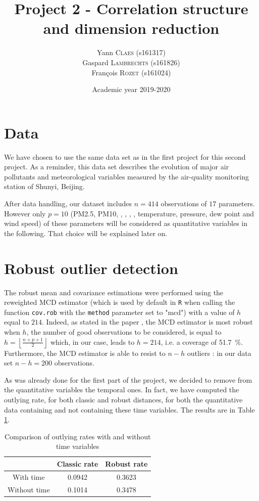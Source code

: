 \documentclass[a4paper, 12pt]{article}
\title{Project 2 - Correlation structure and dimension reduction}
\author{
Yann \textsc{Claes} (s161317)\\
Gaspard \textsc{Lambrechts} (s161826)\\
François \textsc{Rozet} (s161024)\\
}
\date{Academic year 2019-2020}
\begin{document}
	

    \section*{Data}
    
    We have chosen to use the same data set \cite{uci_beijing} as in the first project for this second project. As a reminder, this data set describes the evolution of major air pollutants and meteorological variables measured by the air-quality monitoring station of Shunyi, Beijing.
    
    After data handling, our dataset includes $n = 414$ observations of $17$ parameters. However only $p = 10$ (PM2.5, PM10, , , , , temperature, pressure, dew point and wind speed) of these parameters will be considered as quantitative variables in the following. That choice will be explained later on.

    \section{Robust outlier detection} \label{sec:robust_outlier}
    
    The robust mean and covariance estimations were performed using the reweighted MCD estimator (which is used by default in \texttt{R} when calling the function \texttt{cov.rob} with the \texttt{method} parameter set to "mcd") with a value of $h$ equal to $214$. Indeed, as stated in the paper \cite{mcd_kuleuven}, the MCD estimator is most robust when $h$, the number of good observations to be considered, is equal to
        $h = \left\lfloor \frac{n + p + 1}{2} \right\rfloor$
    which, in our case, leads to $h = 214$, i.e. a coverage of \SI{51.7}{\percent}. Furthermore, the MCD estimator is able to resist to $n - h$ outliers : in our data set $n - h = 200$ observations.
    
    As was already done for the first part of the project, we decided to remove from the quantitative variables the temporal ones. In fact, we have computed the outlying rate, for both classic and robust distances, for both the quantitative data containing and not containing these time variables. The results are in Table \ref{tab:maha_time_comparison}.
    
    \begin{table}[h]
        \centering
        \begin{tabular}{|c|c|c|}
            \cline{2-3}
            \multicolumn{1}{c|}{} & Classic rate & Robust rate \\ \hline
            With time & 0.0942 & 0.3623 \\ \hline
            Without time & 0.1014 & 0.3478 \\ \hline
        \end{tabular}
        \vspace{-0.5em}
        \caption{Comparison of outlying rates with and without time variables}
        \vspace{-1em}
        \label{tab:maha_time_comparison}
    \end{table}
\end{document}
